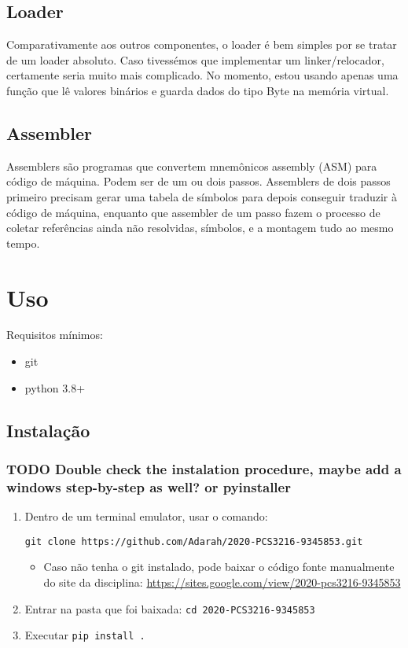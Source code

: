 \documentclass[11pt]{article}
\begin{document}
\subsection{Loader}
\label{sec:orgc7155b9}
Comparativamente aos outros componentes, o loader é bem simples por se tratar de um loader absoluto. Caso tivessémos que implementar um linker/relocador, certamente seria muito mais complicado. No momento, estou usando apenas uma função que lê valores binários e guarda dados do tipo Byte na memória virtual.
\subsection{Assembler}
\label{sec:org67b4885}
Assemblers são programas que convertem mnemônicos assembly (ASM) para código de máquina. Podem ser de um ou dois passos. Assemblers de dois passos primeiro precisam gerar uma tabela de símbolos para depois conseguir traduzir à código de máquina, enquanto que assembler de um passo fazem o processo de coletar referências ainda não resolvidas, símbolos, e a montagem tudo ao mesmo tempo.

\section{Uso}
\label{sec:org7080ac9}
Requisitos mínimos:
\begin{itemize}
\item git
\item python 3.8+
\end{itemize}
\subsection{Instalação}
\label{sec:org8e28e9b}
\subsubsection{{\bfseries\sffamily TODO} Double check the instalation procedure, maybe add a windows step-by-step as well? or pyinstaller}
\label{sec:org74f3a3e}

\begin{enumerate}
\item Dentro de um terminal emulator, usar o comando:

\texttt{git clone https://github.com/Adarah/2020-PCS3216-9345853.git}
\begin{itemize}
\item Caso não tenha o git instalado, pode baixar o código fonte manualmente do site da disciplina:
\url{https://sites.google.com/view/2020-pcs3216-9345853}
\end{itemize}
\item Entrar na pasta que foi baixada: \texttt{cd 2020-PCS3216-9345853}
\item Executar \texttt{pip install .}
\end{enumerate}
\end{document}

